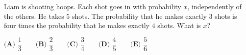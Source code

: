 Liam is shooting hoops. Each shot goes in with probability $x$, independently of the others. He takes $5$ shots. The probability that he makes exactly $3$ shots is four times the probability that he makes exactly $4$ shots. What is $x$?

$\textbf{(A) } \dfrac13 \qquad \textbf{(B) } \dfrac23 \qquad \textbf{(C) } \dfrac34 \qquad \textbf{(D) } \dfrac45 \qquad \textbf{(E) } \dfrac56$
